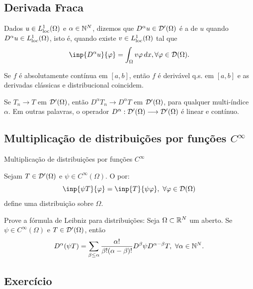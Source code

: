 	
\subsection*{Derivada Fraca}
\begin{frame}
	
\begin{defin}
	Dados  $u\in L_{\operatorname{loc}}^1(\Omega)$ e $\alpha\in \mathbb{N}^N$, dizemos que $D^\alpha u\in \mathcal{D}'(\Omega)$ é a  de $u$ quando $D^\alpha u\in L_{\operatorname{loc}}^1(\Omega)$, isto é, quando existe $v\in L_{\operatorname{loc}}^1(\Omega)$ tal que 
	\[\inp{D^\alpha u}{\varphi}=\int_\Omega v\varphi\, dx, \forall \varphi\in \D(\Omega).\]
\end{defin}

\begin{prop}
Se $f$ é absolutamente contínua em $[a,b]$, então $f$ é derivável q.s. em $[a,b]$ e as derivadas clássicas e distribucional coincidem.
\end{prop}

\begin{prop}
	Se $T_n\to T$ em $\mathcal{D}'(\Omega)$, então $D^\alpha T_n\to D^\alpha T$ em $\mathcal{D}'(\Omega)$, para qualquer multi-índice $\alpha$. Em outras palavras, o operador $D^\alpha: \mathcal{D}'(\Omega) \longrightarrow \mathcal{D}'(\Omega)$ é linear e contínuo.
\end{prop}
\end{frame}

\subsection*{Multiplicação de distribuições por funções $C^\infty$}
\begin{frame}{Multiplicação de distribuições por funções $C^\infty$}
\begin{defin}
	Sejam $T\in \mathcal{D}'(\Omega)$ e $\psi\in C^\infty(\Omega) $. O  por:
	\[\inp{\psi T}{\varphi}=\inp{T}{\psi \varphi},\ \forall \varphi\in \D(\Omega) \]
	define uma distribuição sobre $\Omega$.
\end{defin}

\begin{exer}
	Prove a fórmula de Leibniz para distribuições: 	Seja $\Omega\subset \mathbb{R}^N$ um aberto. Se $\psi\in C^\infty(\Omega)$ e $T\in \mathcal{D}'(\Omega)$, então
	\[D^\alpha(\psi T)=\sum_{\beta\leq \alpha}\frac{\alpha!}{\beta!(\alpha-\beta)!}D^\beta\psi D^{\alpha-\beta}T,\ \forall \alpha\in \mathbb{N}^N.\]
\end{exer}
\subsection*{Exercício \theexer}
\end{frame}

